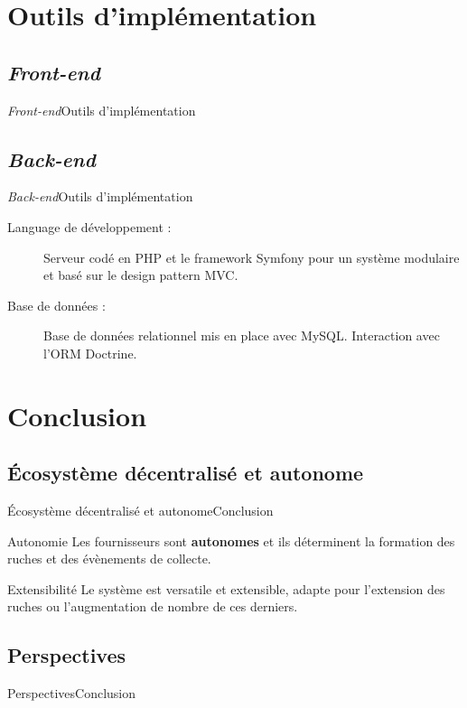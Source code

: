 \documentclass{beamer}
\begin{document}
\section{Outils d'implémentation}
\subsection{\protect\textit{Front-end}}
\begin{frame}{\textit{Front-end}}{Outils d'implémentation}
\end{frame}

\subsection{\protect\textit{Back-end}}
\begin{frame}{\textit{Back-end}}{Outils d'implémentation}
  \begin{description}
    \item[Language de développement :] Serveur codé en PHP et le framework Symfony pour un système modulaire et basé sur le design pattern MVC.
    \item[Base de données :] Base de données relationnel mis en place avec MySQL. Interaction avec l'ORM Doctrine.
  \end{description}
\end{frame}
\section{Conclusion}
\subsection{Écosystème décentralisé et autonome}
\begin{frame}{Écosystème décentralisé et autonome}{Conclusion}

\begin{block}{Autonomie}
Les fournisseurs sont \textbf{autonomes} et ils déterminent la formation des ruches et des évènements de collecte.
\end{block} 
\begin{block}{Extensibilité}
Le système est versatile et extensible, adapte pour l'extension des ruches ou l'augmentation de nombre de ces derniers.
\end{block} 

\end{frame}

\subsection{Perspectives}
\begin{frame}{Perspectives}{Conclusion}
\end{frame}
\end{document}
